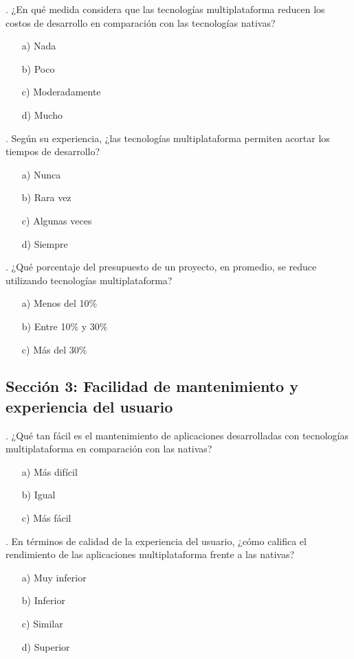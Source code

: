 . ¿En qué medida considera que las tecnologías multiplataforma reducen los costos de desarrollo en comparación con las tecnologías nativas?  
   \begin{itemize}
       \item[a)] Nada  
       \item[b)] Poco  
       \item[c)] Moderadamente  
       \item[d)] Mucho  
   \end{itemize}

. Según su experiencia, ¿las tecnologías multiplataforma permiten acortar los tiempos de desarrollo?  
   \begin{itemize}
       \item[a)] Nunca  
       \item[b)] Rara vez  
       \item[c)] Algunas veces  
       \item[d)] Siempre  
   \end{itemize}

. ¿Qué porcentaje del presupuesto de un proyecto, en promedio, se reduce utilizando tecnologías multiplataforma?  
   \begin{itemize}
       \item[a)] Menos del 10\%  
       \item[b)] Entre 10\% y 30\%  
       \item[c)] Más del 30\%  
   \end{itemize}

\subsection*{Sección 3: Facilidad de mantenimiento y experiencia del usuario}

. ¿Qué tan fácil es el mantenimiento de aplicaciones desarrolladas con tecnologías multiplataforma en comparación con las nativas?  
   \begin{itemize}
       \item[a)] Más difícil  
       \item[b)] Igual  
       \item[c)] Más fácil  
   \end{itemize}

. En términos de calidad de la experiencia del usuario, ¿cómo califica el rendimiento de las aplicaciones multiplataforma frente a las nativas?  
   \begin{itemize}
       \item[a)] Muy inferior  
       \item[b)] Inferior  
       \item[c)] Similar  
       \item[d)] Superior  
   \end{itemize}

